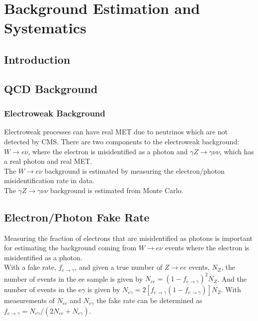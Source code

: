 \chapter{Background Estimation and Systematics}

\section{Introduction}

\section{QCD Background}

\subsection{Electroweak Background}

Electroweak processes can have real MET due to neutrinos which are not
detected by CMS. There are two components to the electroweak background:
$W\rightarrow e\nu$, where the electron is misidentified as a photon and 
$\gamma Z\rightarrow\gamma\nu\nu$, which has a real photon and real MET. \\

The $W\rightarrow e\nu$ background is estimated by measuring the electron/photon
misidentification rate in data. \\

The $\gamma Z\rightarrow\gamma\nu\nu$ background is estimated from Monte Carlo.

\section{Electron/Photon Fake Rate}

Measuring the fraction of electrons that are misidentified as photons is
important for estimating the background coming from $W\rightarrow e\nu$ events
where the electron is misidentified as a photon. \\

With a fake rate, $f_{e\rightarrow\gamma}$, and given a true number of
$Z\rightarrow ee$ events, $N_{Z}$, the number of events in the ee sample is
given by $N_{ee} = (1 - f_{e\rightarrow\gamma})^{2}N_{Z}$. And the number of
events in the e$\gamma$ is given by $N_{e\gamma} = 2[f_{e\rightarrow\gamma}(1 -
f_{e\rightarrow\gamma})]N_{Z}$. With measurements of $N_{ee}$ and $N_{e\gamma}$
the fake rate can be determined as $f_{e\rightarrow\gamma} =
N_{e\gamma}/(2N_{ee} + N_{e\gamma})$. \\


